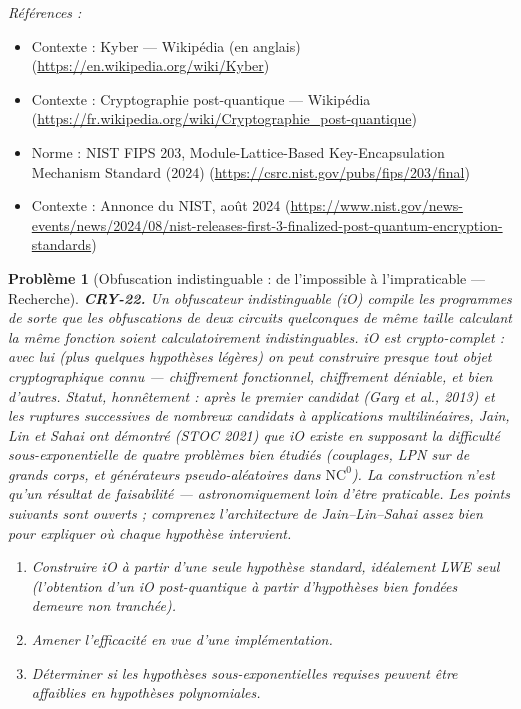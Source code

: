 \documentclass[11pt]{article}
\newtheorem{problem}{Problème}
\newenvironment{refs}{\par\small\noindent\emph{Références :}\begin{itemize}\setlength\itemsep{0pt}}{\end{itemize}\normalsize}
\begin{document}
\begin{refs}
\item Contexte : Kyber --- Wikipédia (en anglais) (\url{https://en.wikipedia.org/wiki/Kyber})
\item Contexte : Cryptographie post-quantique --- Wikipédia (\url{https://fr.wikipedia.org/wiki/Cryptographie_post-quantique})
\item Norme : NIST FIPS 203, Module-Lattice-Based Key-Encapsulation Mechanism Standard (2024) (\url{https://csrc.nist.gov/pubs/fips/203/final})
\item Contexte : Annonce du NIST, août 2024 (\url{https://www.nist.gov/news-events/news/2024/08/nist-releases-first-3-finalized-post-quantum-encryption-standards})
\end{refs}

\bigskip

\begin{problem}[{Obfuscation indistinguable : de l'impossible à l'impraticable --- Recherche}]
\textbf{CRY-22.} Un obfuscateur indistinguable (iO)
compile les programmes de sorte que les obfuscations de deux circuits quelconques de même
taille calculant la même fonction soient calculatoirement indistinguables. iO est
\og{} crypto-complet \fg{} : avec lui (plus quelques hypothèses légères) on peut construire presque
tout objet cryptographique connu --- chiffrement fonctionnel, chiffrement déniable, et bien
d'autres. Statut, honnêtement : après le premier candidat (Garg et al., 2013) et les ruptures
successives de nombreux candidats à applications multilinéaires, Jain, Lin et Sahai ont
démontré (STOC 2021) que iO existe en supposant la difficulté sous-exponentielle de quatre
problèmes bien étudiés (couplages, LPN sur de grands corps, et générateurs pseudo-aléatoires
dans $\mathrm{NC}^0$). La construction n'est qu'un résultat de faisabilité --- astronomiquement
loin d'être praticable. Les points suivants sont ouverts ; comprenez l'architecture de
Jain--Lin--Sahai assez bien pour expliquer où chaque hypothèse intervient.
\begin{enumerate}
\item[(a)] Construire iO à partir d'une seule hypothèse standard,
idéalement LWE seul (l'obtention d'un iO post-quantique à partir d'hypothèses bien fondées
demeure non tranchée).
\item[(b)] Amener l'efficacité en vue d'une implémentation.
\item[(c)] Déterminer
si les hypothèses sous-exponentielles requises peuvent être affaiblies en hypothèses
polynomiales.
\end{enumerate}

\end{problem}
\end{document}
